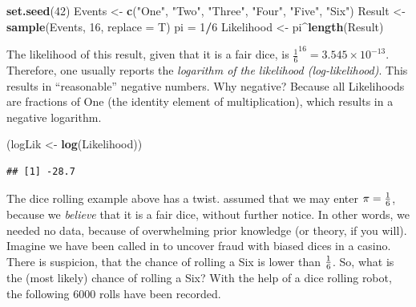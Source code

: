 \documentclass[]{svmono}
\newenvironment{Shaded}{\begin{snugshade}}{\end{snugshade}}
\newcommand{\KeywordTok}[1]{\textcolor[rgb]{0.13,0.29,0.53}{\textbf{#1}}}
\newcommand{\DataTypeTok}[1]{\textcolor[rgb]{0.13,0.29,0.53}{#1}}
\newcommand{\DecValTok}[1]{\textcolor[rgb]{0.00,0.00,0.81}{#1}}
\newcommand{\StringTok}[1]{\textcolor[rgb]{0.31,0.60,0.02}{#1}}
\newcommand{\OperatorTok}[1]{\textcolor[rgb]{0.81,0.36,0.00}{\textbf{#1}}}
\newcommand{\NormalTok}[1]{#1}
\begin{document}
\begin{Shaded}
\begin{Highlighting}[]
\KeywordTok{set.seed}\NormalTok{(}\DecValTok{42}\NormalTok{)}
\NormalTok{Events <-}\StringTok{ }\KeywordTok{c}\NormalTok{(}\StringTok{"One"}\NormalTok{, }\StringTok{"Two"}\NormalTok{, }\StringTok{"Three"}\NormalTok{, }\StringTok{"Four"}\NormalTok{, }\StringTok{"Five"}\NormalTok{, }\StringTok{"Six"}\NormalTok{)}
\NormalTok{Result <-}\StringTok{ }\KeywordTok{sample}\NormalTok{(Events, }\DecValTok{16}\NormalTok{, }\DataTypeTok{replace =}\NormalTok{ T)}
\NormalTok{pi =}\StringTok{ }\DecValTok{1}\OperatorTok{/}\DecValTok{6}
\NormalTok{Likelihood <-}\StringTok{ }\NormalTok{pi}\OperatorTok{^}\KeywordTok{length}\NormalTok{(Result)}
\end{Highlighting}
\end{Shaded}

The likelihood of this result, given that it is a fair dice, is
\(\frac 1 6^{16} = 3.545\times 10^{-13}\). Therefore, one usually
reports the \emph{logarithm of the likelihood (log-likelihood)}. This
results in ``reasonable'' negative numbers. Why negative? Because all
Likelihoods are fractions of One (the identity element of
multiplication), which results in a negative logarithm.

\begin{Shaded}
\begin{Highlighting}[]
\NormalTok{(logLik <-}\StringTok{ }\KeywordTok{log}\NormalTok{(Likelihood))}
\end{Highlighting}
\end{Shaded}

\begin{verbatim}
## [1] -28.7
\end{verbatim}

The dice rolling example above has a twist. assumed that we may enter
\(\pi = {1 \over 6}\), because we \emph{believe} that it is a fair dice,
without further notice. In other words, we needed no data, because of
overwhelming prior knowledge (or theory, if you will). Imagine we have
been called in to uncover fraud with biased dices in a casino. There is
suspicion, that the chance of rolling a Six is lower than \(1 \over 6\).
So, what is the (most likely) chance of rolling a Six? With the help of
a dice rolling robot, the following 6000 rolls have been recorded.
\end{document}
